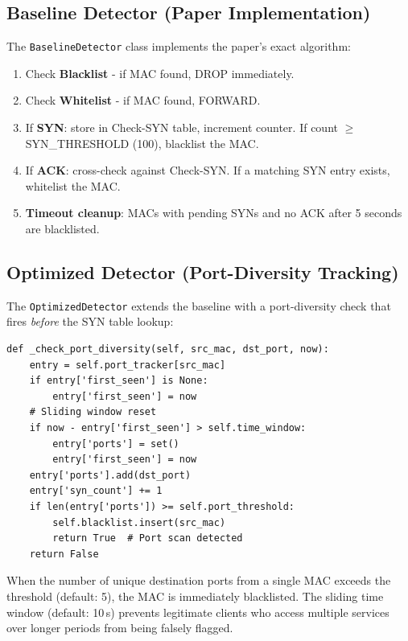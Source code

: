\documentclass[12pt, a4paper]{article}
\begin{document}
\subsection{Baseline Detector (Paper Implementation)}

The \texttt{BaselineDetector} class implements the paper's exact algorithm:

\begin{enumerate}[itemsep=3pt]
    \item Check \textbf{Blacklist} - if MAC found, DROP immediately.
    \item Check \textbf{Whitelist} - if MAC found, FORWARD.
    \item If \textbf{SYN}: store in Check-SYN table, increment counter. If count $\geq$ SYN\_THRESHOLD (100), blacklist the MAC.
    \item If \textbf{ACK}: cross-check against Check-SYN. If a matching SYN entry exists, whitelist the MAC.
    \item \textbf{Timeout cleanup}: MACs with pending SYNs and no ACK after 5 seconds are blacklisted.
\end{enumerate}

\subsection{Optimized Detector (Port-Diversity Tracking)}

The \texttt{OptimizedDetector} extends the baseline with a port-diversity check that fires \textit{before} the SYN table lookup:

\begin{lstlisting}[caption={Port-Diversity Check - proactive detection}]
def _check_port_diversity(self, src_mac, dst_port, now):
    entry = self.port_tracker[src_mac]
    if entry['first_seen'] is None:
        entry['first_seen'] = now
    # Sliding window reset
    if now - entry['first_seen'] > self.time_window:
        entry['ports'] = set()
        entry['first_seen'] = now
    entry['ports'].add(dst_port)
    entry['syn_count'] += 1
    if len(entry['ports']) >= self.port_threshold:
        self.blacklist.insert(src_mac)
        return True  # Port scan detected
    return False
\end{lstlisting}

When the number of unique destination ports from a single MAC exceeds the threshold (default: 5), the MAC is immediately blacklisted. The sliding time window (default: 10\,s) prevents legitimate clients who access multiple services over longer periods from being falsely flagged.
\end{document}
